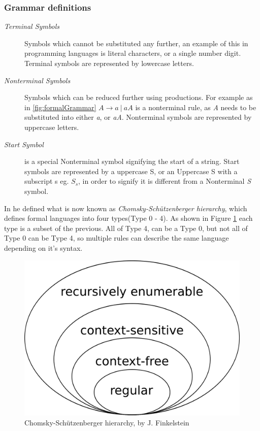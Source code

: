 \subsubsection{Grammar definitions}
\begin{description}
    \item[\textit{Terminal Symbols}] Symbols which cannot be substituted any further, an example of this in programming languages is literal characters, or a single number digit. Terminal symbols are represented by lowercase letters.
    
    \item[\textit{Nonterminal Symbols}] Symbols which can be reduced further using productions. For example as in \ref{fig:formalGrammar} $A \rightarrow a\ |\ aA$ is a nonterminal rule, as \textit{A} needs to be substituted into either \textit{a}, or \textit{aA}. Nonterminal symbols are represented by uppercase letters.

    \item[\textit{Start Symbol}] is a special Nonterminal symbol signifying the start of a string. Start symbols are represented by a uppercase S, or an Uppercase S with a subscript s eg. $S_s$, in order to signify it is different from a Nonterminal \textit{S} symbol.
\end{description}

In \autocite{Chomsky} he defined what is now known as \textit{Chomsky-Schützenberger hierarchy}, which defines formal languages into four types(Type 0 - 4). As shown in Figure \ref{fig:Chomsky} each type is a subset of the previous. All of Type 4, can be a Type 0, but not all of Type 0 can be Type 4, so multiple rules can describe the same language depending on it's syntax.
\begin{figure}[ht!]
    \centerline{\includegraphics[width=0.5\linewidth]{img/Chomsky.png}}
    \caption{Chomsky-Schützenberger hierarchy, by J. Finkelstein}
    \label{fig:Chomsky}
\end{figure}
